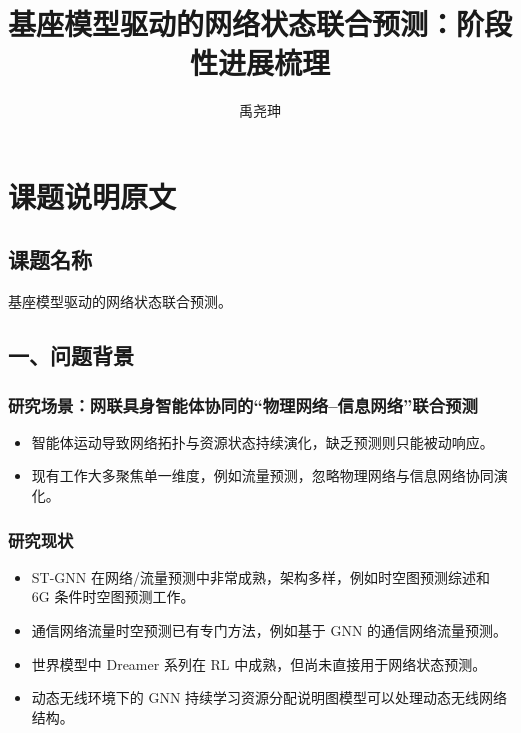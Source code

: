 ﻿\documentclass[UTF8,a4paper,11pt]{ctexart}
\title{基座模型驱动的网络状态联合预测：阶段性进展梳理}
\author{禹尧珅}
\date{}
\begin{document}
\maketitle
\thispagestyle{fancy}

\section{课题说明原文}

\subsection{课题名称}

基座模型驱动的网络状态联合预测。

\subsection{一、问题背景}

\subsubsection{研究场景：网联具身智能体协同的“物理网络--信息网络”联合预测}

\begin{itemize}
  \item 智能体运动导致网络拓扑与资源状态持续演化，缺乏预测则只能被动响应。
  \item 现有工作大多聚焦单一维度，例如流量预测，忽略物理网络与信息网络协同演化。
\end{itemize}

\subsubsection{研究现状}

\begin{itemize}
  \item ST-GNN 在网络/流量预测中非常成熟，架构多样，例如时空图预测综述\cite{sahili2025stgnn}和 6G 条件时空图预测工作\cite{elgendi2026stgnn}。
  \item 通信网络流量时空预测已有专门方法，例如基于 GNN 的通信网络流量预测\cite{qin2024stcomm}。
  \item 世界模型中 Dreamer 系列\cite{hafner2020dreamer}在 RL 中成熟，但尚未直接用于网络状态预测。
  \item 动态无线环境下的 GNN 持续学习资源分配\cite{zhou2025continual}说明图模型可以处理动态无线网络结构。
\end{itemize}
\end{document}
